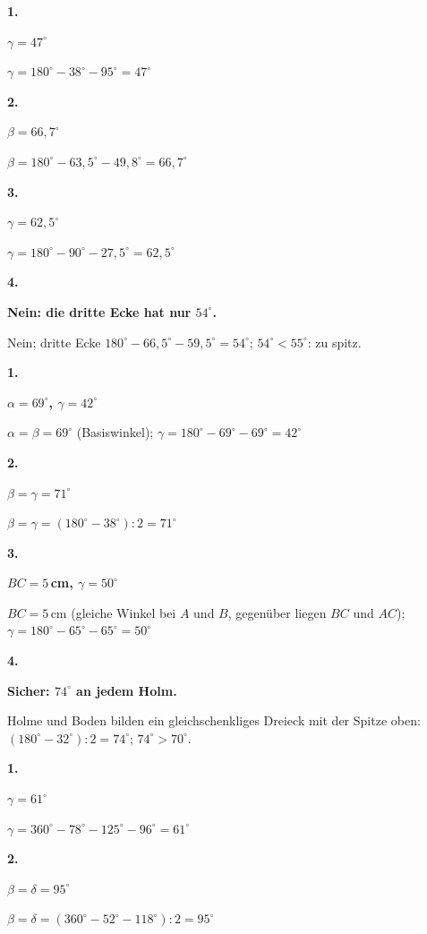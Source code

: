 \documentclass[11pt]{article}
\newcommand{\lsg}[3]{\par\noindent\begin{minipage}[t]{9mm}\textbf{#1}\end{minipage}%
  \begin{minipage}[t]{52mm}\raggedright\bfseries\boldmath #2\end{minipage}\hspace{3mm}%
  \begin{minipage}[t]{\dimexpr\linewidth-64mm\relax}\raggedright\small #3\end{minipage}\par\vspace{4pt}}
\begin{document}
\par\smallskip
{}\par
\par\Needspace{25mm}\vspace{6pt}\noindent\colorbox{black!12}{}\hspace{2mm}{\bfseries Winkelsumme im Dreieck}\par\vspace{4pt}
\lsg{1.}{$\gamma = 47^\circ$}{$\gamma = 180^\circ - 38^\circ - 95^\circ = 47^\circ$}
\lsg{2.}{$\beta = 66{,}7^\circ$}{$\beta = 180^\circ - 63{,}5^\circ - 49{,}8^\circ = 66{,}7^\circ$}
\lsg{3.}{$\gamma = 62{,}5^\circ$}{$\gamma = 180^\circ - 90^\circ - 27{,}5^\circ = 62{,}5^\circ$}
\lsg{4.}{Nein: die dritte Ecke hat nur $54^\circ$.}{Nein; dritte Ecke $180^\circ - 66{,}5^\circ - 59{,}5^\circ = 54^\circ$; $54^\circ < 55^\circ$: zu spitz.}
\par\Needspace{25mm}\vspace{6pt}\noindent\colorbox{black!12}{}\hspace{2mm}{\bfseries Gleichschenklige Dreiecke}\par\vspace{4pt}
\lsg{1.}{$\alpha = 69^\circ$, $\gamma = 42^\circ$}{$\alpha = \beta = 69^\circ$ (Basiswinkel); $\gamma = 180^\circ - 69^\circ - 69^\circ = 42^\circ$}
\lsg{2.}{$\beta = \gamma = 71^\circ$}{$\beta = \gamma = (180^\circ - 38^\circ) : 2 = 71^\circ$}
\lsg{3.}{$BC = 5$\,cm, $\gamma = 50^\circ$}{$BC = 5$\,cm (gleiche Winkel bei $A$ und $B$, gegenüber liegen $BC$ und $AC$); $\gamma = 180^\circ - 65^\circ - 65^\circ = 50^\circ$}
\lsg{4.}{Sicher: $74^\circ$ an jedem Holm.}{Holme und Boden bilden ein gleichschenkliges Dreieck mit der Spitze oben: $(180^\circ - 32^\circ) : 2 = 74^\circ$; $74^\circ > 70^\circ$.}
\par\Needspace{25mm}\vspace{6pt}\noindent\colorbox{black!12}{}\hspace{2mm}{\bfseries Winkelsumme im Viereck}\par\vspace{4pt}
\lsg{1.}{$\gamma = 61^\circ$}{$\gamma = 360^\circ - 78^\circ - 125^\circ - 96^\circ = 61^\circ$}
\lsg{2.}{$\beta = \delta = 95^\circ$}{$\beta = \delta = (360^\circ - 52^\circ - 118^\circ) : 2 = 95^\circ$}
\end{document}
